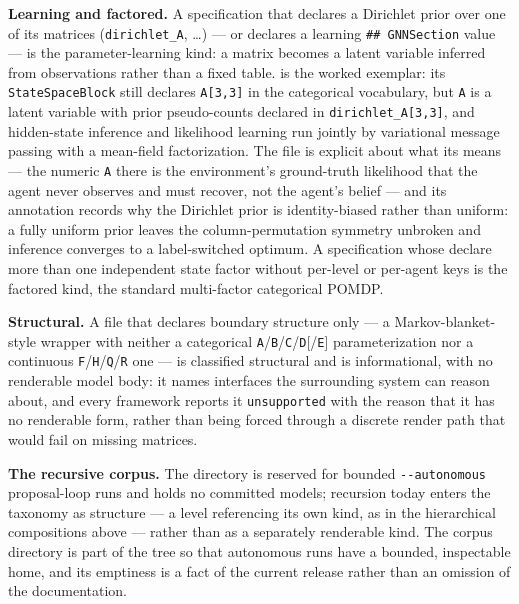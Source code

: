 \documentclass[
  english,
  9pt,
]{extarticle}
\begin{document}
\textbf{Learning and factored.} A specification that declares a
Dirichlet prior over one of its matrices (\texttt{dirichlet\_A}, \ldots)
--- or declares a learning \texttt{\#\#\ GNNSection} value --- is the
parameter-learning kind: a matrix becomes a latent variable inferred
from observations rather than a fixed table.
 is
the worked exemplar: its \texttt{StateSpaceBlock} still declares
\texttt{A{[}3,3{]}} in the categorical vocabulary, but \texttt{A} is a
latent variable with prior pseudo-counts declared in
\texttt{dirichlet\_A{[}3,3{]}}, and hidden-state inference and
likelihood learning run jointly by variational message passing with a
mean-field factorization. The file is explicit about what its
 means --- the numeric \texttt{A} there
is the environment's ground-truth likelihood that the agent never
observes and must recover, not the agent's belief --- and its annotation
records why the Dirichlet prior is identity-biased rather than uniform:
a fully uniform prior leaves the column-permutation symmetry unbroken
and inference converges to a label-switched optimum. A specification
whose  declare more than one independent
state factor without per-level or per-agent keys is the factored kind,
the standard multi-factor categorical POMDP.

\textbf{Structural.} A file that declares boundary structure only --- a
Markov-blanket-style wrapper with neither a categorical
\texttt{A}/\texttt{B}/\texttt{C}/\texttt{D}{[}/\texttt{E}{]}
parameterization nor a continuous
\texttt{F}/\texttt{H}/\texttt{Q}/\texttt{R} one --- is classified
structural and is informational, with no renderable model body: it names
interfaces the surrounding system can reason about, and every framework
reports it \texttt{unsupported} with the reason that it has no
renderable form, rather than being forced through a discrete render path
that would fail on missing matrices.

\textbf{The recursive corpus.} The 
directory is reserved for bounded \texttt{-\/-autonomous} proposal-loop
runs and holds no committed models; recursion today enters the taxonomy
as structure --- a level referencing its own kind, as in the
hierarchical compositions above --- rather than as a separately
renderable kind. The corpus directory is part of the tree so that
autonomous runs have a bounded, inspectable home, and its emptiness is a
fact of the current release rather than an omission of the
documentation.
\end{document}
